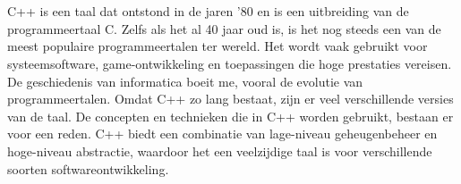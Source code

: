 




\chapter{}%
\label{ch:inleiding}


C++ is een taal dat ontstond in de jaren '80 en is een uitbreiding van de programmeertaal C.
Zelfs als het al 40 jaar oud is, is het nog steeds een van de meest populaire programmeertalen ter wereld.
Het wordt vaak gebruikt voor systeemsoftware, game-ontwikkeling en toepassingen die hoge prestaties vereisen. De geschiedenis van informatica 
boeit me, vooral de evolutie van programmeertalen. Omdat C++ zo lang bestaat, zijn er veel verschillende versies van de taal. 
De concepten en technieken die in C++ worden gebruikt, bestaan er voor een reden.
C++ biedt een combinatie van lage-niveau geheugenbeheer en hoge-niveau abstractie, waardoor het een veelzijdige taal is voor verschillende soorten 
softwareontwikkeling.


